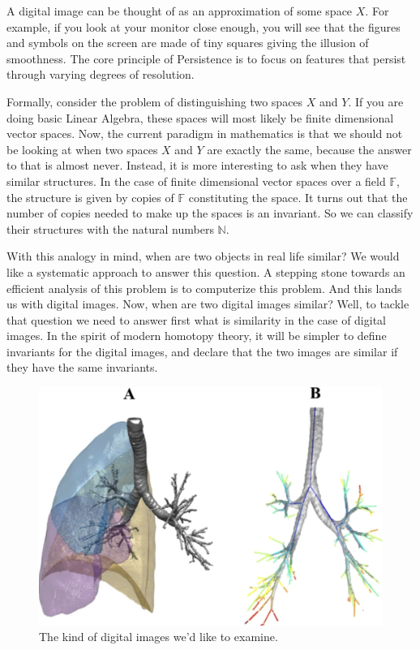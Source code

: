 \documentclass[12pt]{article}
\theoremstyle{theorem}
\theoremstyle{definition}
\theoremstyle{remark}
\theoremstyle{gremark}
\theoremstyle{discussion}
\theoremstyle{notation}
\begin{document}
		
	
		A digital image can be thought of as an approximation of some space $X$. 
		For example, if you look at your monitor close enough, you will see that the figures and symbols on the screen are made of tiny squares giving the illusion of smoothness. The core principle of Persistence is to focus on features that persist through varying degrees of resolution. 
		
		Formally, consider the problem of distinguishing two spaces $X$ and $Y$. If you are doing basic Linear Algebra, these spaces will most likely be finite dimensional vector spaces. Now, the current paradigm in mathematics is that we should not be looking at when two spaces $X$ and $Y$ are exactly the same, because the answer to that is almost never. Instead, it is more interesting to ask when they have similar structures. In the case of finite dimensional vector spaces over a field $\mathbb{F}$, the structure is given by copies of $\mathbb{F}$ constituting the space. It turns out that the number of copies needed to make up the spaces is an invariant. So we can classify their structures with the natural numbers $\mathbb{N}$.
		
		With this analogy in mind, when are two objects in real life similar? We would like a systematic approach to answer this question. A stepping stone towards an efficient analysis of this problem is to computerize this problem. And this lands us with digital images. Now, when are two digital images similar? Well, to tackle that question we need to answer first what is similarity in the case of digital images. In the spirit of modern homotopy theory, it will be simpler to define invariants for the digital images, and declare that the two images are similar if they have the same invariants. 
		
		\begin{figure}
			\centering
				\includegraphics[scale=0.5]{lungs}
			 \caption{The kind of digital images we'd like to examine. \cite{belchi_lung_2018}}
		\end{figure}
		
\end{document}
